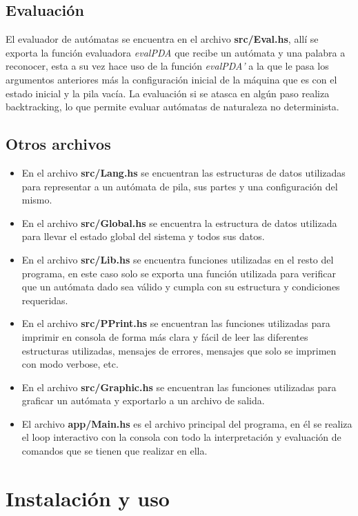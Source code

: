 \documentclass[12pt,a4paper]{article}
\begin{document}
\subsection{Evaluación}
El evaluador de autómatas se encuentra en el archivo \textbf{src/Eval.hs},
allí se exporta la función evaluadora \emph{evalPDA} que recibe un autómata y una palabra 
a reconocer, esta a su vez hace uso de la función \emph{evalPDA'} a la que le pasa
los argumentos anteriores más la configuración inicial de la máquina que es
con el estado inicial y la pila vacía.
La evaluación si se atasca en algún paso realiza backtracking, lo que permite
evaluar autómatas de naturaleza no determinista.

\subsection{Otros archivos}
\begin{itemize}
  \item En el archivo \textbf{src/Lang.hs} se encuentran las estructuras de datos
  utilizadas para representar a un autómata de pila, sus partes y una configuración del mismo.
  \item En el archivo \textbf{src/Global.hs} se encuentra la estructura de datos
  utilizada para llevar el estado global del sistema y todos sus datos.
  \item En el archivo \textbf{src/Lib.hs} se encuentra funciones utilizadas en
  el resto del programa, en este caso solo se exporta una función utilizada para verificar
  que un autómata dado sea válido y cumpla con su estructura y condiciones requeridas.
  \item En el archivo \textbf{src/PPrint.hs} se encuentran las funciones utilizadas
  para imprimir en consola de forma más clara y fácil de leer las diferentes estructuras
  utilizadas, mensajes de errores, mensajes que solo se imprimen con modo verbose, etc.
  \item En el archivo \textbf{src/Graphic.hs} se encuentran las funciones utilizadas
  para graficar un autómata y exportarlo a un archivo de salida.
  \item El archivo \textbf{app/Main.hs} es el archivo principal del programa,
  en él se realiza el loop interactivo con la consola con todo la interpretación
  y evaluación de comandos que se tienen que realizar en ella.
\end{itemize}

\newpage

\section{Instalación y uso}
\end{document}
